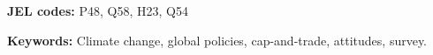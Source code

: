 \begin{abstract}
\end{abstract}

\textbf{JEL codes:} P48, Q58, H23, Q54 %

\textbf{Keywords:} Climate change, global policies, cap-and-trade, attitudes, survey.%


